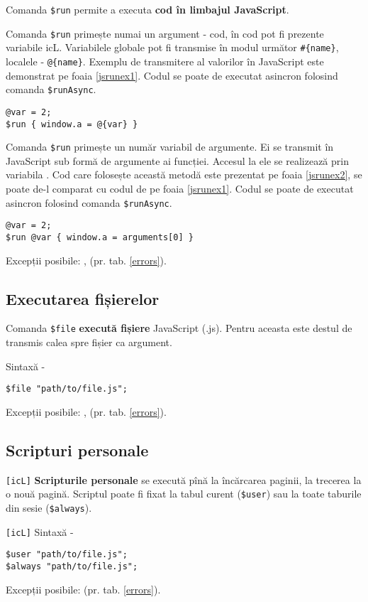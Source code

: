 Comanda \lstinline|$run| permite a executa {\bf cod în limbajul JavaScript}.

\code{[icL]} Comanda \lstinline|$run| primește numai un argument - cod, în cod pot fi prezente variabile icL. Variabilele globale pot fi transmise în modul următor \lstinline|#{name}|, localele - \lstinline|@{name}|. Exemplu de transmitere al valorilor în JavaScript este demonstrat pe foaia \ref{jsrunex1}. Codul se poate de executat asincron folosind comanda \lstinline|$runAsync|.

\begin{lstlisting}[caption=Executarea codului în limbajul JavaScript (icL), label=jsrunex1]
@var = 2;
$run { window.a = @{var} }
\end{lstlisting}

\code{[w3c]} Comanda \lstinline|$run| primește un număr variabil de argumente. Ei se transmit în JavaScript sub formă de argumente ai funcției. Accesul la ele se realizează prin variabila . Cod care folosește această metodă este prezentat pe foaia \ref{jsrunex2}, se poate de-l comparat cu codul de pe foaia \ref{jsrunex1}. Codul se poate de executat asincron folosind comanda \lstinline|$runAsync|.

\begin{lstlisting}[caption=Executarea codului în limbajul JavaScript (w3c), label=jsrunex2]
@var = 2;
$run @var { window.a = arguments[0] }
\end{lstlisting}

Excepții posibile: ,  (pr. tab. \ref{errors}).

\subsection{Executarea fișierelor}

Comanda \lstinline|$file| {\bf execută fișiere} JavaScript (.js). Pentru aceasta este destul de transmis calea spre fișier ca argument.

Sintaxă -
\begin{lstlisting}[numbers=none]
$file "path/to/file.js";
\end{lstlisting}

Excepții posibile: ,  (pr. tab. \ref{errors}).

\subsection{Scripturi personale}

\lstinline|[icL]| {\bf Scripturile personale} se execută pînă la încărcarea paginii, la trecerea la o nouă pagină. Scriptul poate fi fixat la tabul curent (\lstinline|$user|) sau la toate taburile din sesie (\lstinline|$always|).

\lstinline|[icL]| Sintaxă -
\begin{lstlisting}[numbers=none]
$user "path/to/file.js";
$always "path/to/file.js";
\end{lstlisting}

Excepții posibile:  (pr. tab. \ref{errors}).

